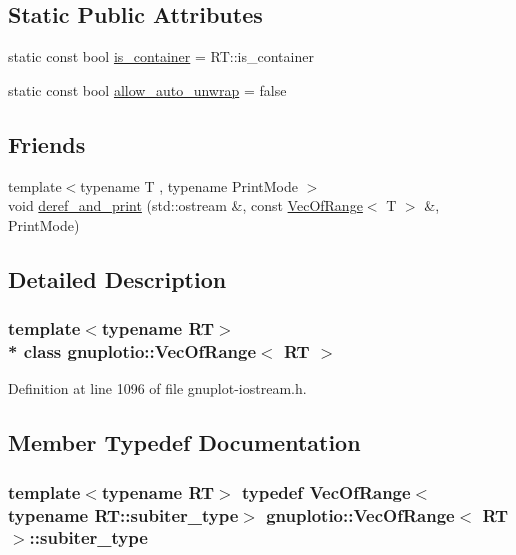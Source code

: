 \subsection*{Static Public Attributes}
\begin{DoxyCompactItemize}
\item 
static const bool \hyperlink{classgnuplotio_1_1_vec_of_range_a8725d4907d46575dddb7152f1f1d1f66}{is\+\_\+container} = R\+T\+::is\+\_\+container
\item 
static const bool \hyperlink{classgnuplotio_1_1_vec_of_range_a19d87e61a7854f9e22d3dd8a94f79500}{allow\+\_\+auto\+\_\+unwrap} = false
\end{DoxyCompactItemize}
\subsection*{Friends}
\begin{DoxyCompactItemize}
\item 
{\footnotesize template$<$typename T , typename Print\+Mode $>$ }\\void \hyperlink{classgnuplotio_1_1_vec_of_range_adafbfb0122b8e499d1af9c246f4ac288}{deref\+\_\+and\+\_\+print} (std\+::ostream \&, const \hyperlink{classgnuplotio_1_1_vec_of_range}{Vec\+Of\+Range}$<$ T $>$ \&, Print\+Mode)
\end{DoxyCompactItemize}


\subsection{Detailed Description}
\subsubsection*{template$<$typename RT$>$\\*
class gnuplotio\+::\+Vec\+Of\+Range$<$ R\+T $>$}



Definition at line 1096 of file gnuplot-\/iostream.\+h.



\subsection{Member Typedef Documentation}
\subsubsection[{\texorpdfstring{subiter\+\_\+type}{subiter_type}}]{\setlength{\rightskip}{0pt plus 5cm}template$<$typename RT$>$ typedef {\bf Vec\+Of\+Range}$<$typename R\+T\+::subiter\+\_\+type$>$ {\bf gnuplotio\+::\+Vec\+Of\+Range}$<$ RT $>$\+::{\bf subiter\+\_\+type}}\hypertarget{classgnuplotio_1_1_vec_of_range_a4cfae20b9797febceffafec3415b52db}{}\label{classgnuplotio_1_1_vec_of_range_a4cfae20b9797febceffafec3415b52db}


